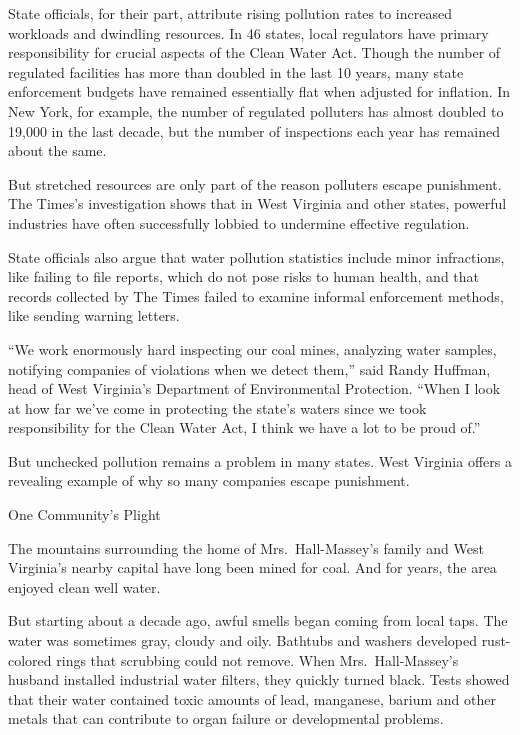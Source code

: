 ﻿\documentclass[12pt]{article}
\begin{document}
State officials, for their part, attribute rising pollution rates to increased workloads and
dwindling resources. In 46 states, local regulators have primary responsibility for crucial aspects
of the Clean Water Act. Though the number of regulated facilities has more than doubled in the last
10 years, many state enforcement budgets have remained essentially flat when adjusted for inflation.
In New York, for example, the number of regulated polluters has almost doubled to 19,000 in the last
decade, but the number of inspections each year has remained about the same.

But stretched resources are only part of the reason polluters escape punishment. The Times's
investigation shows that in West Virginia and other states, powerful industries have often
successfully lobbied to undermine effective regulation.

State officials also argue that water pollution statistics include minor infractions, like failing
to file reports, which do not pose risks to human health, and that records collected by The Times
failed to examine informal enforcement methods, like sending warning letters.

``We work enormously hard inspecting our coal mines, analyzing water samples, notifying companies of
violations when we detect them,'' said Randy Huffman, head of West Virginia's Department of
Environmental Protection. ``When I look at how far we've come in protecting the state's waters since
we took responsibility for the Clean Water Act, I think we have a lot to be proud of.''

But unchecked pollution remains a problem in many states. West Virginia offers a revealing example
of why so many companies escape punishment.

One Community's Plight

The mountains surrounding the home of Mrs.~Hall-Massey's family and West Virginia's nearby capital
have long been mined for coal. And for years, the area enjoyed clean well water.

But starting about a decade ago, awful smells began coming from local taps. The water was sometimes
gray, cloudy and oily. Bathtubs and washers developed rust-colored rings that scrubbing could not
remove. When Mrs.~Hall-Massey's husband installed industrial water filters, they quickly turned
black. Tests showed that their water contained toxic amounts of lead, manganese, barium and other
metals that can contribute to organ failure or developmental problems.
\end{document}
